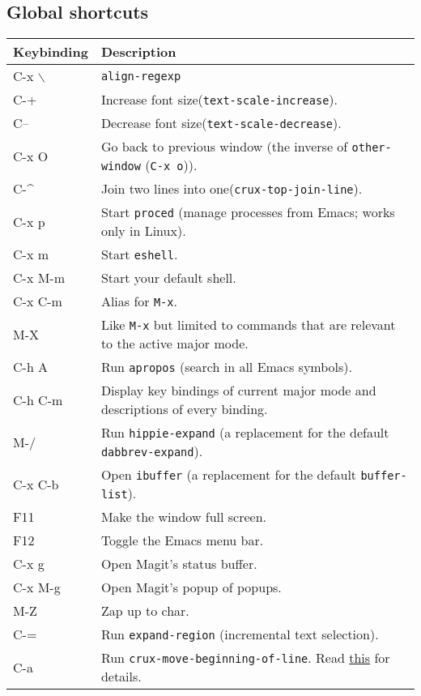\documentclass[11pt]{article}
\begin{document}
\subsection{Global shortcuts}
\label{sec:org7b0270f}
\begin{center}
\begin{tabular}{ll}
Keybinding & Description\\
\hline
C-x $\backslash$ & \texttt{align-regexp}\\
C-+ & Increase font size(\texttt{text-scale-increase}).\\
C-- & Decrease font size(\texttt{text-scale-decrease}).\\
C-x O & Go back to previous window (the inverse of \texttt{other-window} (\texttt{C-x o})).\\
C-\^{} & Join two lines into one(\texttt{crux-top-join-line}).\\
C-x p & Start \texttt{proced} (manage processes from Emacs; works only in Linux).\\
C-x m & Start \texttt{eshell}.\\
C-x M-m & Start your default shell.\\
C-x C-m & Alias for \texttt{M-x}.\\
M-X & Like \texttt{M-x} but limited to commands that are relevant to the active major mode.\\
C-h A & Run \texttt{apropos} (search in all Emacs symbols).\\
C-h C-m & Display key bindings of current major mode and descriptions of every binding.\\
M-/ & Run \texttt{hippie-expand} (a replacement for the default \texttt{dabbrev-expand}).\\
C-x C-b & Open \texttt{ibuffer} (a replacement for the default \texttt{buffer-list}).\\
F11 & Make the window full screen.\\
F12 & Toggle the Emacs menu bar.\\
C-x g & Open Magit's status buffer.\\
C-x M-g & Open Magit's popup of popups.\\
M-Z & Zap up to char.\\
C-= & Run \texttt{expand-region} (incremental text selection).\\
C-a & Run \texttt{crux-move-beginning-of-line}. Read \href{http://emacsredux.com/blog/2013/05/22/smarter-navigation-to-the-beginning-of-a-line/}{this} for details.\\
\end{tabular}
\end{center}
\end{document}
